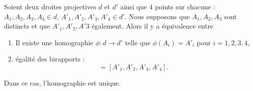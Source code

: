 \begin{proposition}      \label{PROPooMGYDooHqSoJs}
    Soient deux droites projectives \( d\) et \( d'\) ainsi que \( 4\) points sur chacune : \( A_1,A_2,A_3,A_4\in d\), \( A'_1,A'_2,A'_3,A'_4\in d'\). Nous supposons que \( A_1,A_2,A_3\) sont distincts et que \( A'_1,A'_2,A'3\) également. Alors il y a équivalence entre
    \begin{enumerate}
        \item       \label{ITEMooIDKBooXHnNDi}
            Il existe une homographie \( \phi\colon d\to d'\) telle que \( \phi(A_i)=A'_i\) pour \( i=1,2,3,4\),
        \item       \label{ITEMooCDWAooIckJwT}
            égalité des birapports :
            \begin{equation}
                [A_1,A_2,A_3,A_4]=[A'_1,A'_2,A'_3,A'_4].
            \end{equation}
    \end{enumerate}
    Dans ce cas, l'homographie est unique.
\end{proposition}

